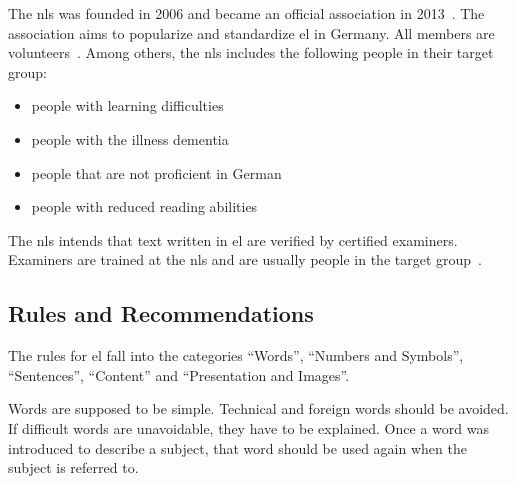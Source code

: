 The \gls{nls} was founded in 2006 and became an official association in 2013~\autocite{netzwerkHistory}.
The association aims to popularize and standardize \gls{el} in Germany.
All members are volunteers~\autocite{netzwerkGoals}.
Among others, the \gls{nls} includes the following people in their target group:
\begin{itemize}[noitemsep]
    \item people with learning difficulties
    \item people with the illness dementia
    \item people that are not proficient in German
    \item people with reduced reading abilities
\end{itemize}
The \gls{nls} intends that text written in \gls{el} are verified by certified examiners.
Examiners are trained at the \gls{nls} and are usually people in the target group~\autocite{netzwerkPruef}.


\subsection{Rules and Recommendations}\label{subsec:el-rules}
The rules for \gls{el} fall into the categories \enquote{Words}, \enquote{Numbers and Symbols}, \enquote{Sentences}, \enquote{Content} and \enquote{Presentation and Images}.

Words are supposed to be simple.
Technical and foreign words should be avoided.
If difficult words are unavoidable, they have to be explained.
Once a word was introduced to describe a subject, that word should be used again when the subject is referred to.

